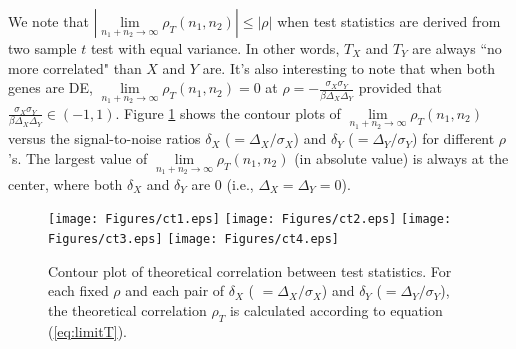 %			

We note that $|\lim\limits_{n_1 + n_2 \rightarrow \infty} \rho_T(n_1, n_2)| \leq |\rho|$ when test 
statistics are derived from two sample $t$ test 
with equal variance. In other words, $T_X$ and $T_Y$ are always ``no more correlated" than $X$ 
and $Y$ are. It's also interesting to note that when both genes are DE, $\lim\limits_{n_1 + n_2 
\rightarrow \infty} \rho_T(n_1, n_2)=0$ at $\rho 
=-\frac{\sigma_X\sigma_Y}{\beta\Delta_X\Delta_Y} $ provided that
$\frac{\sigma_X\sigma_Y}{\beta\Delta_X\Delta_Y} \in (-1, 1)$. Figure \ref{fig:ct} shows the 
contour plots of $\lim\limits_{n_1 + n_2 \rightarrow \infty} \rho_T(n_1, n_2)$ versus the 
signal-to-noise ratios $\delta_X$ ($=\Delta_X/\sigma_X$) 
and $\delta_Y$ ($=\Delta_Y/\sigma_Y$) for different $\rho$'s. The largest value of 
$\lim\limits_{n_1 + n_2 \rightarrow \infty} \rho_T(n_1, n_2)$ (in 
absolute value) 
is always at the center, where both $\delta_X$ and $\delta_Y$ are 0 (i.e., $\Delta_X =\Delta_Y 
= 0$).

\begin{figure}[!ht]
	\centering
	\texttt{[image: Figures/ct1.eps]}
	\texttt{[image: Figures/ct2.eps]}
	\texttt{[image: Figures/ct3.eps]}
	\texttt{[image: Figures/ct4.eps]}
	\caption[Contour plot of theoretical correlation between test statistics.]{Contour plot of 
		theoretical correlation between test statistics. For 
		each fixed $\rho$ and each pair of $\delta_X$ (	$=\Delta_X/\sigma_X$) 
		and $\delta_Y$ ($=\Delta_Y/\sigma_Y$), the theoretical correlation $\rho_T$ is 
		calculated according to equation (\ref{eq:limitT}).}
	\label{fig:ct}
\end{figure}


